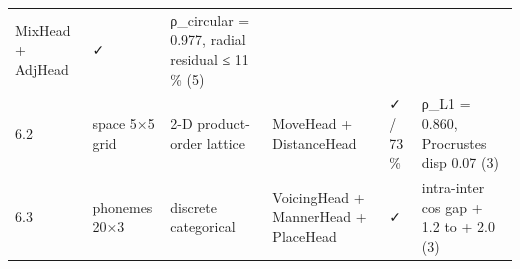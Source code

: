 \begin{longtable}[]{@{}llllll@{}}
\begin{minipage}[t]{0.14\columnwidth}
MixHead + AdjHead\strut
\end{minipage} & \begin{minipage}[t]{0.14\columnwidth}\raggedright
✓\strut
\end{minipage} & \begin{minipage}[t]{0.14\columnwidth}\raggedright
ρ\_circular = 0.977, radial residual ≤ 11 \% (5)\strut
\end{minipage}\tabularnewline
\begin{minipage}[t]{0.14\columnwidth}\raggedright
6.2\strut
\end{minipage} & \begin{minipage}[t]{0.14\columnwidth}\raggedright
space 5×5 grid\strut
\end{minipage} & \begin{minipage}[t]{0.14\columnwidth}\raggedright
2-D product-order lattice\strut
\end{minipage} & \begin{minipage}[t]{0.14\columnwidth}\raggedright
MoveHead + DistanceHead\strut
\end{minipage} & \begin{minipage}[t]{0.14\columnwidth}\raggedright
✓ / 73 \%\strut
\end{minipage} & \begin{minipage}[t]{0.14\columnwidth}\raggedright
ρ\_L1 = 0.860, Procrustes disp 0.07 (3)\strut
\end{minipage}\tabularnewline
\begin{minipage}[t]{0.14\columnwidth}\raggedright
6.3\strut
\end{minipage} & \begin{minipage}[t]{0.14\columnwidth}\raggedright
phonemes 20×3\strut
\end{minipage} & \begin{minipage}[t]{0.14\columnwidth}\raggedright
discrete categorical\strut
\end{minipage} & \begin{minipage}[t]{0.14\columnwidth}\raggedright
VoicingHead + MannerHead + PlaceHead\strut
\end{minipage} & \begin{minipage}[t]{0.14\columnwidth}\raggedright
✓\strut
\end{minipage} & \begin{minipage}[t]{0.14\columnwidth}\raggedright
intra-inter cos gap + 1.2 to + 2.0 (3)\strut
\end{minipage}\tabularnewline
\bottomrule
\end{longtable}

